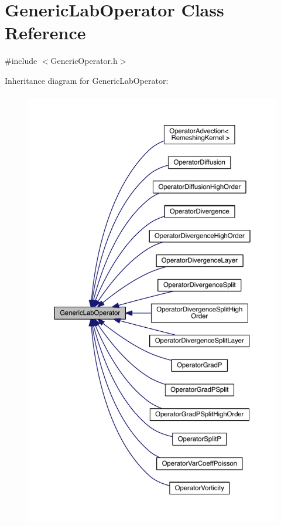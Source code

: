\hypertarget{class_generic_lab_operator}{}\section{Generic\+Lab\+Operator Class Reference}
\label{class_generic_lab_operator}


{\ttfamily \#include $<$Generic\+Operator.\+h$>$}



Inheritance diagram for Generic\+Lab\+Operator\+:\nopagebreak
\begin{figure}[H]
\begin{center}
\leavevmode
\includegraphics[height=550pt]{df/d01/class_generic_lab_operator__inherit__graph}
\end{center}
\end{figure}
